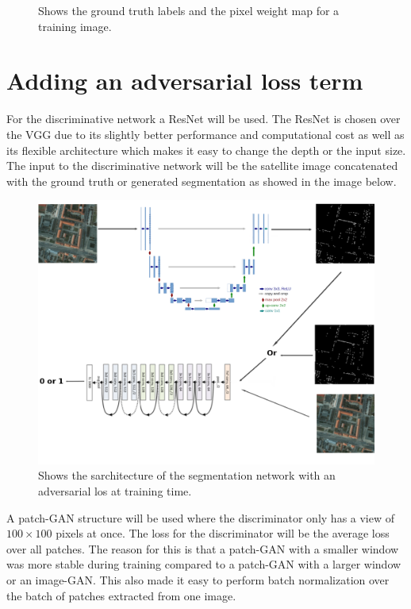 \documentclass{kththesis}
\begin{document}
\begin{figure}[H]
\endminipage\hfill
\caption{Shows the ground truth labels and the pixel weight map for a training image.}
\end{figure}
\section{Adding an adversarial loss term}
For the discriminative network a ResNet will be used. The ResNet is chosen over the VGG due to its slightly better performance and computational cost \parencite{johnson_cnn-benchmarks:_2018} as well as its flexible architecture which makes it easy to change the depth or the input size. The input to the discriminative network will be the satellite image concatenated with the ground truth or generated segmentation as showed in the image below. 
\begin{figure}[H]
  \centering
      \includegraphics[scale=0.25]{gan_no_n}
  \caption{Shows the sarchitecture of the segmentation network with an adversarial los at training time.} \label{fig:GAN}
\end{figure}
\noindent A patch-GAN structure will be used where the discriminator only has a view of $100 \times 100$ pixels at once. The loss for the discriminator will be the average loss over all patches. The reason for this is that a patch-GAN with a smaller window was more stable during training compared to a patch-GAN with a larger window or an image-GAN. This also made it easy to perform batch normalization over the batch of patches extracted from one image.\\
\end{document}
